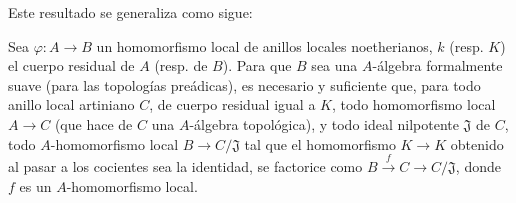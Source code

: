
Este resultado se generaliza como sigue:

\begin{proposition}[22.1.4]
\label{0.22.1.4-fr}
Sea $\varphi:A\to B$ un homomorfismo local de anillos locales noetherianos,
$k$ \textup{(resp. $K$)} el cuerpo residual de $A$ \textup{(resp. de $B$)}. Para que $B$ sea una
$A$-álgebra formalmente suave (para las topologías preádicas), es necesario y
suficiente que, para todo anillo local \textup{artiniano} $C$, de cuerpo residual \textup{igual
a} $K$, todo homomorfismo local $A\to C$ (que hace de $C$ una $A$-álgebra
topológica), y todo ideal nilpotente $\mathfrak J$ de $C$, todo
$A$-homomorfismo local $B\to C/\mathfrak J$ tal que el homomorfismo
$K\to K$ obtenido al pasar a los cocientes sea la identidad, se factorice como
$B\xrightarrow{f}C\to C/\mathfrak J$,
donde $f$ es un $A$-homomorfismo local.
\end{proposition}

